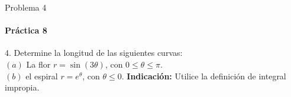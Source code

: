 \documentclass{plantillaPPT}
\begin{document}
\begin{frame}{Problema 4}
\framesubtitle{Práctica 8}

4. Determine la longitud de las siguientes curvas:\\[5pt]
$(a)$ La flor $r = \sin(3\theta)$, con $0\leq\theta\leq\pi$.\\
$(b)$ el espiral $r = e^\theta$, con $\theta\leq0$. \textbf{Indicación: }Utilice la definición de integral impropia.
    
\end{frame}
\end{document}
